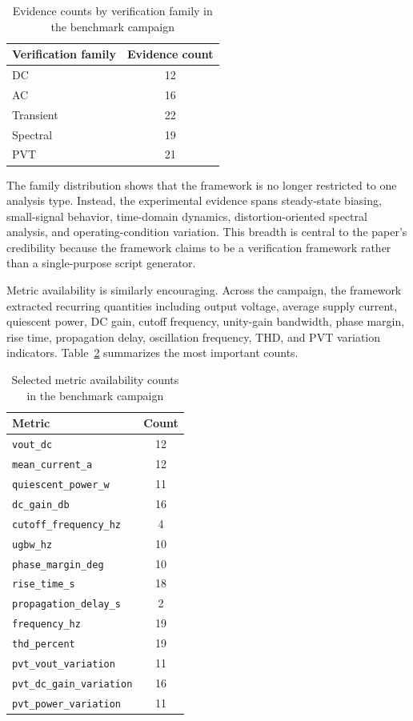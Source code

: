 \documentclass[conference]{IEEEtran}
\begin{document}
\begin{table}[t]
\caption{Evidence counts by verification family in the benchmark campaign}
\label{tab:coverage}
\centering
\begin{tabular}{lc}
\toprule
Verification family & Evidence count \\
\midrule
DC & 12 \\
AC & 16 \\
Transient & 22 \\
Spectral & 19 \\
PVT & 21 \\
\bottomrule
\end{tabular}
\end{table}

The family distribution shows that the framework is no longer restricted to one analysis type. Instead, the experimental evidence spans steady-state biasing, small-signal behavior, time-domain dynamics, distortion-oriented spectral analysis, and operating-condition variation. This breadth is central to the paper's credibility because the framework claims to be a verification framework rather than a single-purpose script generator.

Metric availability is similarly encouraging. Across the campaign, the framework extracted recurring quantities including output voltage, average supply current, quiescent power, DC gain, cutoff frequency, unity-gain bandwidth, phase margin, rise time, propagation delay, oscillation frequency, THD, and PVT variation indicators. Table~\ref{tab:metricavailability} summarizes the most important counts.

\begin{table}[t]
\caption{Selected metric availability counts in the benchmark campaign}
\label{tab:metricavailability}
\centering
\begin{tabular}{lc}
\toprule
Metric & Count \\
\midrule
\texttt{vout\_dc} & 12 \\
\texttt{mean\_current\_a} & 12 \\
\texttt{quiescent\_power\_w} & 11 \\
\texttt{dc\_gain\_db} & 16 \\
\texttt{cutoff\_frequency\_hz} & 4 \\
\texttt{ugbw\_hz} & 10 \\
\texttt{phase\_margin\_deg} & 10 \\
\texttt{rise\_time\_s} & 18 \\
\texttt{propagation\_delay\_s} & 2 \\
\texttt{frequency\_hz} & 19 \\
\texttt{thd\_percent} & 19 \\
\texttt{pvt\_vout\_variation} & 11 \\
\texttt{pvt\_dc\_gain\_variation} & 16 \\
\texttt{pvt\_power\_variation} & 11 \\
\bottomrule
\end{tabular}
\end{table}
\end{document}
